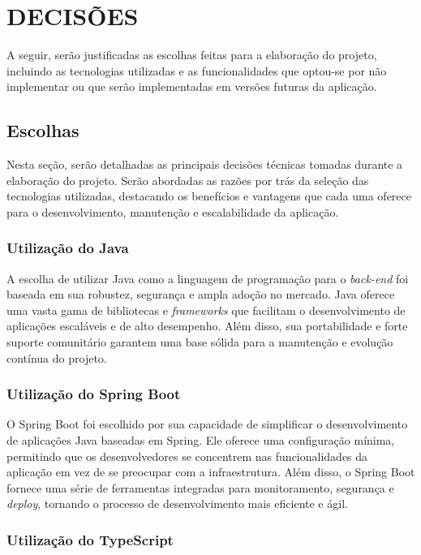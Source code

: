 \chapter{DECISÕES}
\label{escolhas-descartes}
A seguir, serão justificadas as escolhas feitas para a elaboração do projeto, incluindo as tecnologias utilizadas e as funcionalidades que optou-se por não implementar ou que serão implementadas em versões futuras da aplicação.

\section{Escolhas}

Nesta seção, serão detalhadas as principais decisões técnicas tomadas durante a elaboração do projeto. Serão abordadas as razões por trás da seleção das tecnologias utilizadas, destacando os benefícios e vantagens que cada uma oferece para o desenvolvimento, manutenção e escalabilidade da aplicação.

\subsection{Utilização do Java}

A escolha de utilizar Java como a linguagem de programação para o \textit{back-end} foi baseada em sua robustez, segurança e ampla adoção no mercado. Java oferece uma vasta gama de bibliotecas e \textit{frameworks} que facilitam o desenvolvimento de aplicações escaláveis e de alto desempenho. Além disso, sua portabilidade e forte suporte comunitário garantem uma base sólida para a manutenção e evolução contínua do projeto.

\subsection{Utilização do Spring Boot}

O Spring Boot foi escolhido por sua capacidade de simplificar o desenvolvimento de aplicações Java baseadas em Spring. Ele oferece uma configuração mínima, permitindo que os desenvolvedores se concentrem nas funcionalidades da aplicação em vez de se preocupar com a infraestrutura. Além disso, o Spring Boot fornece uma série de ferramentas integradas para monitoramento, segurança e \textit{deploy}, tornando o processo de desenvolvimento mais eficiente e ágil.

\subsection{Utilização do TypeScript}

